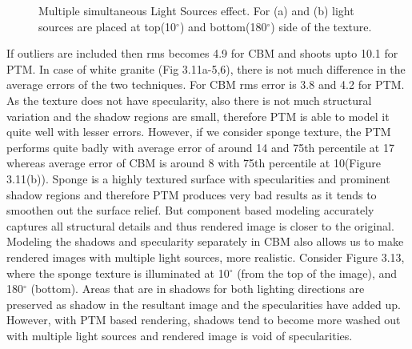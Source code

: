 \begin{figure}[p]
\centering
\caption{Multiple simultaneous Light Sources effect. For (a) and (b) light sources are placed at top(10$^{\circ}$) 
and bottom(180$^{\circ}$) side 
of the texture.}
\end{figure}
If outliers are included then rms becomes 4.9 for CBM and shoots upto 10.1 for PTM.
In case of white granite (Fig 3.11a-5,6), there is not
much difference in the average errors of the two techniques. For CBM rms error is 3.8 and 4.2 for PTM. As the texture does
not have specularity, also there is not much structural variation and the shadow
regions are small, therefore PTM is able to model it quite well with lesser
errors. However, if we consider sponge texture, the PTM performs quite badly
with average error of around 14 and 75th percentile at 17 whereas average error
of CBM is around 8 with 75th percentile at 10(Figure 3.11(b)). Sponge is a highly
textured surface with specularities and prominent shadow regions and therefore
PTM produces very bad results as it tends to smoothen out the surface relief.
But component based modeling accurately captures all structural details and thus
rendered image is closer to the original.
Modeling the shadows and specularity separately in CBM also allows us to make rendered images with
multiple light sources, more realistic. Consider Figure 3.13,
where the sponge texture
is illuminated at 10$^{\circ}$ (from the top of the image), and 180$^{\circ}$
(bottom). Areas that are in shadows for both lighting directions are preserved
as shadow in the resultant image and the specularities have added up. However, with PTM based rendering, shadows tend
to become more washed out with multiple light sources and rendered image is void of specularities.

